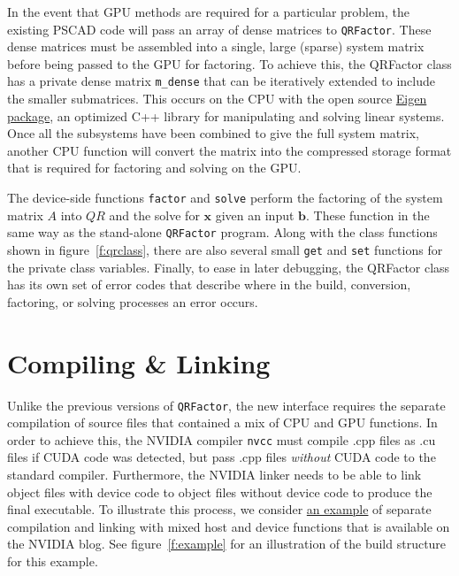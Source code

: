 \documentclass[11pt,letterpaper]{article}
\begin{document}
In the event that GPU methods are required for a particular problem, the existing PSCAD code will pass an array of dense matrices to \verb+QRFactor+. These dense matrices must be assembled into a single, large (sparse) system matrix before being passed to the GPU for factoring. To achieve this, the QRFactor class has a private dense matrix \verb+m_dense+ that can be iteratively extended to include the smaller submatrices. This occurs on the CPU with the open source \href{http://eigen.tuxfamily.org/index.php?title=Main_Page}{Eigen package}, an optimized C++ library for manipulating and solving linear systems. Once all the subsystems have been combined to give the full system matrix, another CPU function will convert the matrix into the compressed storage format that is required for factoring and solving on the GPU. 

The device-side functions \verb+factor+ and \verb+solve+ perform the factoring of the system matrix $A$ into $QR$ and the solve for $\mathbf{x}$ given an input $\mathbf{b}$. These function in the same way as the stand-alone \verb+QRFactor+ program. Along with the class functions shown in figure~\ref{f:qrclass}, there are also several small \verb+get+ and \verb+set+ functions for the private class variables. Finally, to ease in later debugging, the QRFactor class has its own set of error codes that describe where in the build, conversion, factoring, or solving processes an error occurs.


\section*{Compiling \& Linking}

Unlike the previous versions of \verb+QRFactor+, the new interface requires the separate compilation of source files that contained a mix of CPU and GPU functions. In order to achieve this, the NVIDIA compiler \verb+nvcc+ must compile .cpp files as .cu files if CUDA code was detected, but pass .cpp files \emph{without} CUDA code to the standard compiler. Furthermore, the NVIDIA linker needs to be able to link object files with device code to object files without device code to produce the final executable. To illustrate this process, we consider \href{https://developer.nvidia.com/blog/separate-compilation-linking-cuda-device-code/}{an example} of separate compilation and linking with mixed host and device functions that is available on the NVIDIA blog. See figure~\ref{f:example} for an illustration of the build structure for this example. 
\end{document}
